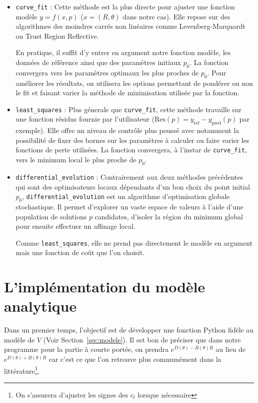 \documentclass[11pt, a4paper, openany]{report}
\begin{document}
\begin{itemize}
  \item \texttt{curve\_fit} : Cette méthode est la plus directe pour ajuster une fonction modèle $y=f(x,p)$
  ($x=(R,\theta)$ dans notre cas). Elle repose sur des algorithmes des moindres 
  carrés non linéaires comme Levenberg-Marquardt ou Trust Region Reflective.
  
  \noindent En pratique, il suffit d'y entrer en argument notre fonction modèle, les données
  de référence ainsi que des paramètres initiaux $p_0$. La fonction convergera vers les paramètres
  optimaux les plus proches de $p_0$. Pour améliorer les résultats, on utilisera
  les options permettant de pondérer ou non le fit et faisant varier la méthode
  de minimisation utilisée par la fonction.
  
  \qquad

  \item \texttt{least\_squares} : Plus génerale que \verb|curve_fit|, cette 
    méthode travaille sur une fonction résidus fournie par l'utilisateur 
    ($\text{Res}(p)=y_{\mathrm{ref}}-y_{\mathrm{pred}}(p)$ par exemple). Elle 
    offre un niveau de contrôle plus poussé avec notamment la possibilité de 
    fixer des bornes sur les paramètres à calculer ou faire varier les fonctions
    de perte utilisées. La fonction convergera, à l'instar de \verb|curve_fit|, 
    vers le minimum local le plus proche de $p_0$.

  \qquad

  \item \texttt{differential\_evolution} : Contrairement aux deux méthodes 
    précédentes qui sont des optimisateurs locaux dépendants d'un bon choix du 
    point initial $p_0$, \verb|differential_evolution| est un algorithme 
    d'optimisation globale stochastique. Il permet d'explorer un vaste espace
    de valeurs à l'aide d'une population de solutions $p$ candidates, d'isoler
    la région du minimum global pour ensuite effectuer un affinage local.

    \noindent Comme \verb|least_squares|, elle ne prend pas directement le 
    modèle en argument mais une fonction de coût que l'on choisit.
\end{itemize}

\section{L'implémentation du modèle analytique}

\noindent Dans un premier temps, l'objectif est de développer une fonction Python fidèle 
au modèle de $V$ (Voir Section~\ref{sec:modele}).
Il est bon de préciser que dans notre programme pour la partie à courte portée, 
on prendra $e^{D(\theta)-B(\theta)R}$ au lieu de $e^{D(\theta)+B(\theta)R}$ 
car c'est ce que l'on retrouve plus communément dans la littérature\footnote{On
s'assurera d'ajuster les signes des $c_l$ lorsque nécessaire}.\\ 
\end{document}
